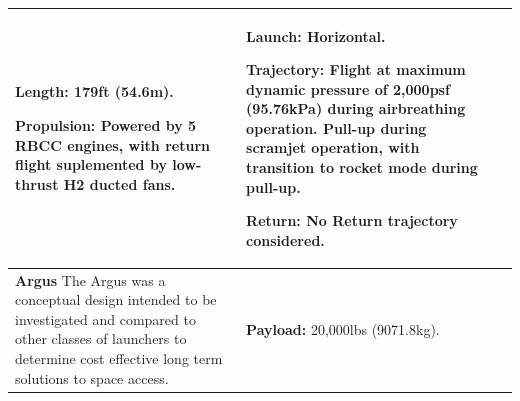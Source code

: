 {\begin{landscape}
\begin{xltabular}{\linewidth}{|X|X|X|}
			\textbf{Length:} 179ft (54.6m). 
			
			
			
			\textbf{Propulsion:} Powered by 5 RBCC engines, with return flight suplemented by low-thrust H2 ducted fans. 
			
			&\small {} 
			
			\textbf{Launch:} Horizontal.
			
			\textbf{Trajectory:} Flight at maximum dynamic pressure of 2,000psf (95.76kPa) during airbreathing operation. Pull-up during scramjet operation, with transition to rocket mode during pull-up. 
			
			\textbf{Return:} No Return trajectory considered.
			
			\\
			\hline \small\textbf{Argus}\cite{Argus} \newline\newline
			The Argus was a conceptual design intended to be investigated and compared to other classes of launchers to determine cost effective long term solutions to space access.  
			&\small
			
			\textbf{Payload:} 20,000lbs (9071.8kg).
			

\end{xltabular}
\end{landscape}}
